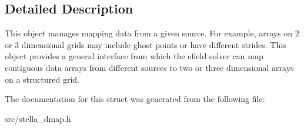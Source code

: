 \subsection{Detailed Description}
This object manages mapping data from a given source. For example, arrays on 2 or 3 dimensional grids may include ghost points or have different strides. This object provides a general interface from which the efield solver can map contiguous data arrays from different sources to two or three dimensional arrays on a structured grid. 

The documentation for this struct was generated from the following file\+:\begin{DoxyCompactItemize}
\item 
src/stella\+\_\+dmap.\+h\end{DoxyCompactItemize}
